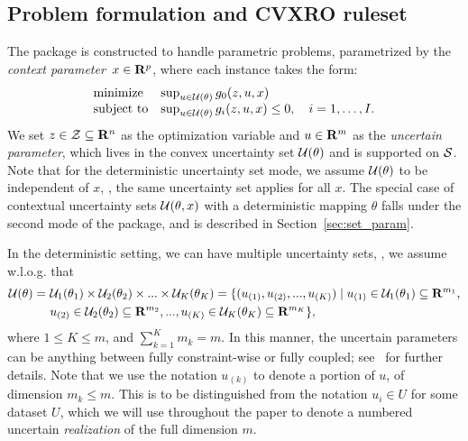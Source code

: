 \subsection{Problem formulation and CVXRO ruleset}
\label{sec:ruleset}
The package is constructed to handle parametric  problems, parametrized by the {\it context parameter}~$x \in {\mathbf R}^p$, where each instance takes the form:
\begin{equation}
	\label{eq:robust_prob}
         \begin{array}[t]{ll}
		\mbox{minimize} & \sup_{u \in {\mathcal{U}}(\theta)} g_0(z,u,x)\\
		\mbox{subject to} & \sup_{u \in {\mathcal{U}}(\theta)} g_i(z,u,x)  \le 0,  \quad i = 1,\dots,I.
	\end{array}
\end{equation}
We set $z \in \mathcal{Z} \subseteq {\mathbf R}^n$ as the optimization variable and $u \in {\mathbf R}^m$ as the {\it uncertain parameter}, which lives in the convex uncertainty set ${\mathcal{U}}(\theta)$ and is supported on $\mathcal{S}$.
Note that for the deterministic uncertainty set mode, we assume ${\mathcal{U}}(\theta)$ to be independent of $x$, \ie, the same uncertainty set applies for all $x$.  
The special case of contextual uncertainty sets ${\mathcal{U}}(\theta,x)$ with a deterministic mapping $\theta$ falls under the second mode of the package, and is described in Section~\ref{sec:set_param}.

In the deterministic setting, we can have multiple uncertainty sets, \ie, we assume w.l.o.g. that
\begin{align*}
    {\mathcal{U}}(\theta) = ~& {\mathcal{U}}_1(\theta_1) \times {\mathcal{U}}_2(\theta_2) \times ... \times {\mathcal{U}}_K(\theta_K) = \{(u_{(1)},u_{(2)},...,u_{(K)}) \mid  u_{(1)} \in {\mathcal{U}}_1(\theta_1)\subseteq {\mathbf R}^{m_1},\\
    & u_{(2)} \in {\mathcal{U}}_2(\theta_2)\subseteq {\mathbf R}^{m_2}, ..., u_{(K)} \in {\mathcal{U}}_K(\theta_K) \subseteq {\mathbf R}^{m_K}\},
\end{align*}
where $1 \leq  K \leq m$, and $\sum_{k=1}^K m_k = m$. In this manner, the uncertain parameters can be anything between fully constraint-wise or fully coupled; see~\cite{coupling} for further details. Note that we use the notation $u_{(k)}$ to denote a portion of $u$, of dimension $m_k \leq m$. This is to be distinguished from the notation $u_i \in U$ for some dataset $U$, which we will use throughout the paper to denote a numbered uncertain {\it realization} of the full dimension $m$.  

